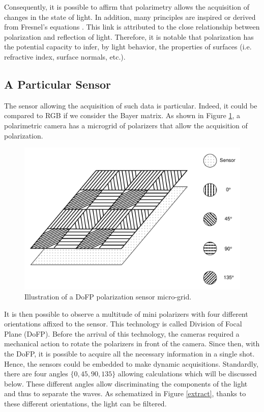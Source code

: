 Consequently, it is possible to affirm that polarimetry allows the acquisition of changes in the state of light\cite{wolff1995polarization}. In addition, many principles are inspired or derived from Fresnel's equations \cite{fresnel1868oeuvres}. This link is attributed to the close relationship between polarization and reflection of light. Therefore, it is notable that polarization has the potential capacity to infer, by light behavior, the properties of surfaces (i.e. refractive index, surface normals, etc.).



\subsection{A Particular Sensor}\label{particularsensor}

The sensor allowing the acquisition of such data is particular.
Indeed, it could be compared to RGB if we consider the Bayer matrix. As shown in Figure \ref{fig:sensor}, a polarimetric camera has a microgrid of polarizers that allow the acquisition of polarization.

\begin{figure}[h]
	\centering
	\includegraphics[width=0.8\linewidth]{Figures/Preliminary/sensor}
	\caption{Illustration of a DoFP polarization sensor micro-grid.}
	\label{fig:sensor}
\end{figure}

It is then possible to observe a multitude of mini polarizers with four different orientations affixed to the sensor. This technology is called Division of Focal Plane (DoFP).
Before the arrival of this technology, the cameras required a mechanical action to rotate the polarizers in front of the camera. Since then, with the DoFP, it is possible to acquire all the necessary information in a single shot. Hence, the sensors could be embedded to make dynamic acquisitions.
Standardly, there are four angles $\{0,45,90,135\}$ allowing calculations which will be discussed below.
These different angles allow discriminating the components of the light and thus to separate the waves. As schematized in Figure \ref{extract}, thanks to these different orientations, the light can be filtered.

